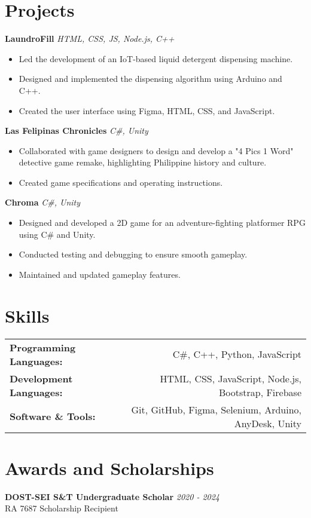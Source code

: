\documentclass[a4paper, 10pt]{article}
\begin{document}
\section*{Projects}
\noindent \textbf{LaundroFill} \hfill \textit{HTML, CSS, JS, Node.js, C++}
\begin{itemize}[leftmargin=0.5in]
  \item Led the development of an IoT-based liquid detergent dispensing machine.
  \item Designed and implemented the dispensing algorithm using Arduino and C++.
  \item Created the user interface using Figma, HTML, CSS, and JavaScript.
\end{itemize}
\noindent \textbf{Las Felipinas Chronicles} \hfill \textit{C\#, Unity}
\begin{itemize}[leftmargin=0.5in]
  \item Collaborated with game designers to design and develop a "4 Pics 1 Word" detective game remake, highlighting Philippine history and culture.
  \item Created game specifications and operating instructions.
\end{itemize}
\noindent \textbf{Chroma} \hfill \textit{C\#, Unity}
\begin{itemize}[leftmargin=0.5in]
  \item Designed and developed a 2D game for an adventure-fighting platformer RPG using C\# and Unity.
  \item Conducted testing and debugging to ensure smooth gameplay.
  \item Maintained and updated gameplay features.
\end{itemize}

\vspace{-1em}

\section*{Skills}
\begin{tabularx}{\textwidth}{@{}X r@{}}
  \textbf{Programming Languages:} & C\#, C++, Python, JavaScript \\
  \textbf{Development Languages:} & HTML, CSS, JavaScript, Node.js, Bootstrap, Firebase \\
  \textbf{Software \& Tools:}     & Git, GitHub, Figma, Selenium, Arduino, AnyDesk, Unity \\
\end{tabularx}

\vspace{-0.5em}

\section*{Awards and Scholarships}
\noindent \textbf{DOST-SEI S\&T Undergraduate Scholar} \hfill \textit{2020 - 2024} \\
RA 7687 Scholarship Recipient
\end{document}
